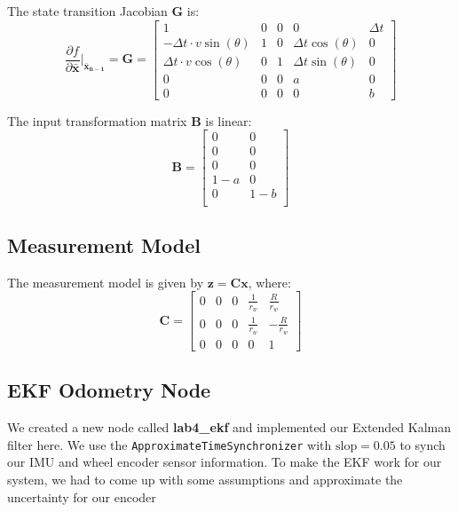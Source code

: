\documentclass[14pt,letterpaper]{article}
\newcommand{\vect}[1]{\bm{#1}}  %
\newcommand{\mat}[1]{\bm{#1}}   %
\begin{document}
The state transition Jacobian $\mat{G}$ is:
\begin{equation}
  \frac{\partial f}{\partial \vect{\bar{x}}}|_{\vect{\bar{x}_{n-1}}} =  \mat{G} =  \begin{bmatrix}
1 & 0 & 0 & 0 & \Delta t \\[0.3em]
-\Delta t \cdot v \sin(\theta) & 1 & 0 & \Delta t \cos(\theta) & 0 \\[0.3em]
\Delta t \cdot v \cos(\theta) & 0 & 1 & \Delta t \sin(\theta) & 0 \\[0.3em]
0 & 0 & 0 & a & 0 \\[0.3em]
0 & 0 & 0 & 0 & b
\end{bmatrix}
\label{eq:jacobian}
\end{equation}

The input transformation matrix $\mat{B}$ is linear:
\begin{equation}
\mat{B} = \begin{bmatrix}
0 & 0 \\[0.3em]
0 & 0 \\[0.3em]
0 & 0 \\[0.3em]
1-a & 0 \\[0.3em]
0 & 1-b \\[0.3em]
\end{bmatrix}
\label{eq:B matrix}
\end{equation}

\subsection{Measurement Model}

The measurement model is given by $\vect{z} = \mat{C}\vect{x}$, where:
\begin{equation}
\mat{C} = \begin{bmatrix}
0 & 0 & 0 & \frac{1}{r_w} & \frac{R}{r_w} \\[0.5em]
0 & 0 & 0 & \frac{1}{r_w} & -\frac{R}{r_w} \\[0.5em]
0 & 0 & 0 & 0 & 1
\end{bmatrix}
\label{eq:measurement_model}
\end{equation}

\subsection{EKF Odometry Node}

We created a new node called \textbf{lab4\_ekf} and implemented our Extended Kalman filter here.
We use the \texttt{ApproximateTimeSynchronizer} with $\text{slop} = 0.05$ to synch our IMU and wheel encoder sensor information.
To make the EKF work for our system, we had to come up with some assumptions and approximate the uncertainty for our encoder
\end{document}
